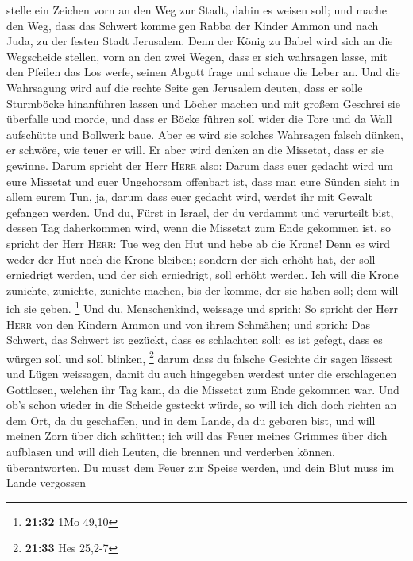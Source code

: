 stelle ein Zeichen vorn an den Weg zur Stadt, dahin es weisen soll; und
mache den Weg, dass das Schwert komme gen Rabba der Kinder Ammon und
nach Juda, zu der festen Stadt Jerusalem.  Denn der König
zu Babel wird sich an die Wegscheide stellen, vorn an den zwei Wegen,
dass er sich wahrsagen lasse, mit den Pfeilen das Los werfe, seinen
Abgott frage und schaue die Leber an.  Und die Wahrsagung
wird auf die rechte Seite gen Jerusalem deuten, dass er solle Sturmböcke
hinanführen lassen und Löcher machen und mit großem Geschrei sie
überfalle und morde, und dass er Böcke führen soll wider die Tore und da
Wall aufschütte und Bollwerk baue.  Aber es wird sie
solches Wahrsagen falsch dünken, er schwöre, wie teuer er will. Er aber
wird denken an die Missetat, dass er sie gewinne.  Darum
spricht der Herr \textsc{Herr} also: Darum dass euer gedacht wird um
eure Missetat und euer Ungehorsam offenbart ist, dass man eure Sünden
sieht in allem eurem Tun, ja, darum dass euer gedacht wird, werdet ihr
mit Gewalt gefangen werden.  Und du, Fürst in Israel, der
du verdammt und verurteilt bist, dessen Tag daherkommen wird, wenn die
Missetat zum Ende gekommen ist,  so spricht der Herr
\textsc{Herr}: Tue weg den Hut und hebe ab die Krone! Denn es wird weder
der Hut noch die Krone bleiben; sondern der sich erhöht hat, der soll
erniedrigt werden, und der sich erniedrigt, soll erhöht werden.
 Ich will die Krone zunichte, zunichte, zunichte machen,
bis der komme, der sie haben soll; dem will ich sie geben. \footnote{\textbf{21:32}
  1Mo 49,10}  Und du, Menschenkind, weissage und sprich:
So spricht der Herr \textsc{Herr} von den Kindern Ammon und von ihrem
Schmähen; und sprich: Das Schwert, das Schwert ist gezückt, dass es
schlachten soll; es ist gefegt, dass es würgen soll und soll blinken,
\footnote{\textbf{21:33} Hes 25,2-7}  darum dass du
falsche Gesichte dir sagen lässest und Lügen weissagen, damit du auch
hingegeben werdest unter die erschlagenen Gottlosen, welchen ihr Tag
kam, da die Missetat zum Ende gekommen war.  Und ob's
schon wieder in die Scheide gesteckt würde, so will ich dich doch
richten an dem Ort, da du geschaffen, und in dem Lande, da du geboren
bist,  und will meinen Zorn über dich schütten; ich will
das Feuer meines Grimmes über dich aufblasen und will dich Leuten, die
brennen und verderben können, überantworten.  Du musst
dem Feuer zur Speise werden, und dein Blut muss im Lande vergossen
